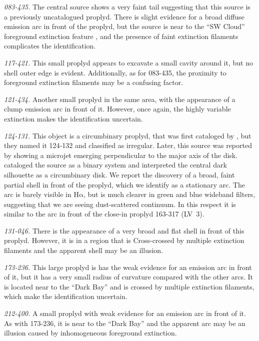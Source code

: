 \documentclass[apj, twocolumn]{aastex63}
\newcommand\ha{\ensuremath{\mathrm{H\alpha}}}
\begin{document}
\textit{083-435.} The central source shows a very faint tail
suggesting that this source is a previously uncatalogued proplyd.
There is slight evidence for a broad diffuse emission arc in front
of the proplyd, but the source is near to the ``SW Cloud'' foreground
extinction feature \citep{ODell:2000a}, and the presence of faint
extinction filaments complicates the identification.


\textit{117-421.} This small proplyd \citep{Ricci:2008a} appears to
excavate a small cavity around it, but no shell outer edge is
evident.  Additionally, as for 083-435, the proximity to foreground
extinction filaments may be a confusing factor. 

\textit{121-434.}  Another small proplyd in the same area, with the
appearance of a clump emission arc in front of it.  However, once
again, the highly variable extinction makes the identification
uncertain.

\textit{124-131.} This object is a circumbinary proplyd, that was
first cataloged by \citet{ODell:1996a}, but they named it 124-132 and
classified as irregular. Later, this source was reported by
\citet{Smith:2005a} showing a microjet emerging perpendicular to the
major axis of the disk. \citet{Ricci:2008a} cataloged the source as a
binary system and \citet{Robberto:2008a} interpreted the central dark
silhouette as a circumbinary disk.  We report the discovery of a
broad, faint partial shell in front of the proplyd, which we identify
as a stationary arc.  The arc is barely visible in \ha{}, but is much
clearer in green and blue wideband filters, suggesting that we are
seeing dust-scattered continuum.  In this respect it is similar to the
arc in front of the close-in proplyd 163-317 (LV~3).

\textit{131-046.}  There is the appearance of a very broad and flat
shell in front of this proplyd.  However, it is in a region that is
Cross-crossed by multiple extinction filaments and the apparent shell
may be an illusion. 


\textit{173-236.} This large proplyd is has the weak evidence for an
emission arc in front of it, but it has a very small radius of
curvature compared with the other arcs.  It is located near to the
``Dark Bay'' \citep{ODell:2000a} and is crossed by multiple extinction
filaments, which make the identification uncertain.

\textit{212-400.}  A small proplyd with weak evidence for an emission
arc in front of it.  As with 173-236, it is near to the ``Dark Bay''
and the apparent arc may be an illusion caused by inhomogeneous
foreground extinction.
\end{document}
